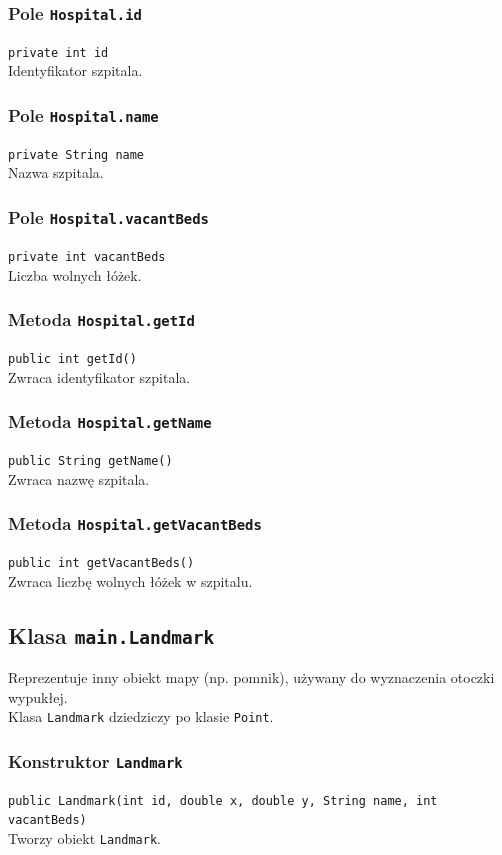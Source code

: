 \documentclass{article}
\begin{document}
\subsubsection{Pole \texttt{Hospital.id}}
\texttt{private int id} \\
Identyfikator szpitala.

\subsubsection{Pole \texttt{Hospital.name}}
\texttt{private String name} \\
Nazwa szpitala.

\subsubsection{Pole \texttt{Hospital.vacantBeds}}
\texttt{private int vacantBeds} \\
Liczba wolnych łóżek.

\subsubsection{Metoda \texttt{Hospital.getId}}
\texttt{public int getId()} \\
Zwraca identyfikator szpitala.

\subsubsection{Metoda \texttt{Hospital.getName}}
\texttt{public String getName()} \\
Zwraca nazwę szpitala.

\subsubsection{Metoda \texttt{Hospital.getVacantBeds}}
\texttt{public int getVacantBeds()} \\
Zwraca liczbę wolnych łóżek w szpitalu.

\subsection{Klasa \texttt{main.Landmark}}
Reprezentuje inny obiekt mapy (np. pomnik), używany do wyznaczenia otoczki wypukłej. \\
Klasa \texttt{Landmark} dziedziczy po klasie \texttt{Point}.

\subsubsection{Konstruktor \texttt{Landmark}}
\texttt{public Landmark(int id, double x, double y, String name, int vacantBeds)} \\
Tworzy obiekt \texttt{Landmark}.
\end{document}
